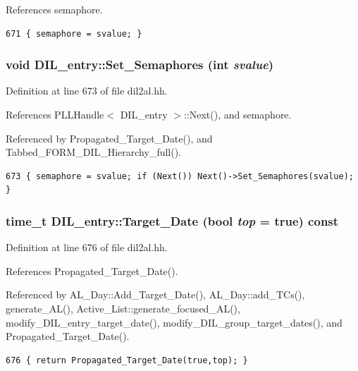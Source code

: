 References semaphore.



\footnotesize\begin{verbatim}671 { semaphore = svalue; }
\end{verbatim}\normalsize 
{}
\subsubsection{\setlength{\rightskip}{0pt plus 5cm}void DIL\_\-entry::Set\_\-Semaphores (int {\em svalue})\hspace{0.3cm}{\tt  [inline]}}\label{classDIL__entry_a10}




Definition at line 673 of file dil2al.hh.

References PLLHandle$<$ DIL\_\-entry $>$::Next(), and semaphore.

Referenced by Propagated\_\-Target\_\-Date(), and Tabbed\_\-FORM\_\-DIL\_\-Hierarchy\_\-full().



\footnotesize\begin{verbatim}673 { semaphore = svalue; if (Next()) Next()->Set_Semaphores(svalue); }
\end{verbatim}\normalsize 
{}
\subsubsection{\setlength{\rightskip}{0pt plus 5cm}time\_\-t DIL\_\-entry::Target\_\-Date (bool {\em top} = {\bf true}) const\hspace{0.3cm}{\tt  [inline]}}\label{classDIL__entry_a12}




Definition at line 676 of file dil2al.hh.

References Propagated\_\-Target\_\-Date().

Referenced by AL\_\-Day::Add\_\-Target\_\-Date(), AL\_\-Day::add\_\-TCs(), generate\_\-AL(), Active\_\-List::generate\_\-focused\_\-AL(), modify\_\-DIL\_\-entry\_\-target\_\-date(), modify\_\-DIL\_\-group\_\-target\_\-dates(), and Propagated\_\-Target\_\-Date().



\footnotesize\begin{verbatim}676 { return Propagated_Target_Date(true,top); }
\end{verbatim}\normalsize 
{}
